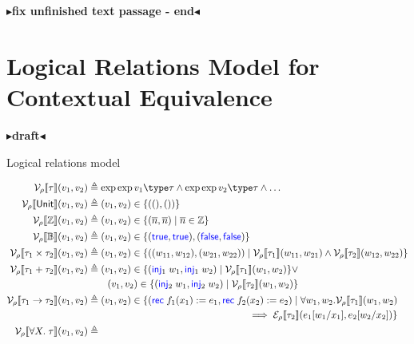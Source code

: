 \documentclass[twoside,11pt,openright]{report}
\theoremstyle{definition}
\newcommand{\Keyword}[1]{{\color{blue} \mathsf{#1}}}
\newcommand{\var}{x}
\newcommand{\expr}{e}
\newcommand{\val}{v}
\newcommand{\valB}{w}
\newcommand{\TT}{()}
\newcommand{\Num}[1]{\overline{#1}}
\newcommand{\True}{\Keyword{true}}
\newcommand{\False}{\Keyword{false}}
\newcommand{\Inj}[1]{\Keyword{inj}_{#1}\;}
\newcommand{\Tvar}{X}
\newcommand{\subst}[3]{#1{\left[#3 \middle/ #2 \right]}}
\newcommand{\Tunit}{\mathsf{Unit}}
\newcommand{\Tint}{\mathbb{Z}}
\newcommand{\Tbool}{\mathbb{B}}
\newcommand{\Tprod}[2]{#1 \times #2}
\newcommand{\Tsum}[2]{#1 + #2}
\newcommand{\Tfunc}[2]{#1 \rightarrow #2}
\newcommand{\Tall}[2]{\forall #1.\; #2}
\newcommand{\typ}{\tau}
\newcommand{\empvenv}{\bullet}
\newcommand{\emptenv}{\bullet}
\def\envs#1#2\exp#3\type#4{#1 \; | \; #2 \; \vdash #3 : #4}
\newcommand{\ValInp}[2]{\mathcal{V}_{#1} \llbracket #2 \rrbracket}
\newcommand{\ValInpGen}[2]{\ValInp{#1}{#2}(\val_1, \val_2)}
\newcommand{\ExpInp}[2]{\mathcal{E}_{#1} \llbracket #2 \rrbracket}
\newcommand{\todo}[1]{{\color[rgb]{.5,0,0}\textbf{$\blacktriangleright$#1$\blacktriangleleft$}}}
\begin{document}
\todo{fix unfinished text passage - end}



\chapter{Logical Relations Model for Contextual Equivalence}
\label{ch:LR}

\todo{draft}

Logical relations model

\begin{align*}
  \ValInpGen{\rho}{\typ}    &\triangleq \envs \emptenv \empvenv \exp \val_1 \type \typ \land \envs \emptenv \empvenv \exp \val_2 \type \typ \land \dots\\
  \ValInpGen{\rho}{\Tunit}  &\triangleq (\val_1, \val_2) \in \{(\TT, \TT)\}\\
  \ValInpGen{\rho}{\Tint}   &\triangleq (\val_1, \val_2) \in \{(\Num{n}, \Num{n}) \mid \Num{n} \in \Tint\}\\
  \ValInpGen{\rho}{\Tbool}  &\triangleq (\val_1, \val_2) \in \{(\True, \True), (\False, \False)\}\\
  \ValInpGen{\rho}{\Tprod{\typ_1}{\typ_2}}  &\triangleq (\val_1, \val_2) \in \{((\valB_{11}, \valB_{12}), (\valB_{21}, \valB_{22})) \mid \ValInp{\rho}{\typ_1}(\valB_{11}, \valB_{21}) \land \ValInp{\rho}{\typ_2}(\valB_{12}, \valB_{22})\}\\
  \ValInpGen{\rho}{\Tsum{\typ_1}{\typ_2}}   &\triangleq 
  \begin{aligned}[t]
    (\val_1, \val_2) \in \{(\Inj{1} \valB_1, \Inj{1} \valB_2) \mid \ValInp{\rho}{\typ_1}(\valB_1, \valB_2)\} \lor \\
    (\val_1, \val_2) \in \{(\Inj{2} \valB_1, \Inj{2} \valB_2) \mid \ValInp{\rho}{\typ_2}(\valB_1, \valB_2)\}
  \end{aligned}\\
  \ValInpGen{\rho}{\Tfunc{\typ_1}{\typ_2}}  &\triangleq 
  \begin{aligned}[t]
    (\val_1, \val_2) \in \{(\Rec f_1 \var_1 := \expr_1, \Rec f_2 \var_2 := \expr_2) \mid \forall \valB_1, \valB_2 . \ValInp{\rho}{\typ_1}(\valB_{1}, \valB_{2})\\
    \implies \ExpInp{\rho}{\typ_2}(\subst{\expr_1}{\var_1}{\valB_1}, \subst{\expr_2}{\var_2}{\valB_2})\}
  \end{aligned}\\
  \ValInpGen{\rho}{\Tall{\Tvar}{\typ}}  &\triangleq 
  \begin{aligned}[t]

\end{aligned}
\end{align*}
\end{document}
